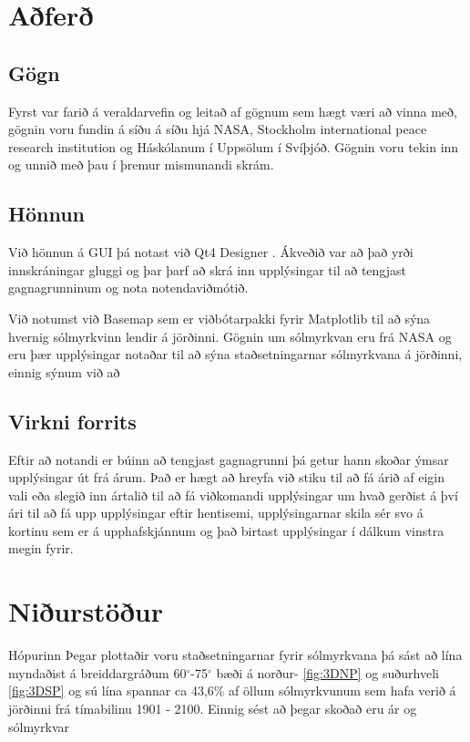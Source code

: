 \documentclass[12pt, git, final]{rureport}
\begin{document}
\section{Aðferð}
\subsection{Gögn}
Fyrst var farið á veraldarvefin og leitað af gögnum sem hægt væri að vinna með, gögnin voru fundin á síðu á síðu hjá NASA\cite{Eclipse}, Stockholm international peace research institution\cite{weapon} og Háskólanum í Uppsölum í Svíþjóð\cite{conflict}. Gögnin voru tekin inn og unnið með þau í þremur mismunandi skrám.
\subsection{Hönnun}
Við hönnun á GUI þá notast  við Qt4 Designer \cite{qt4}. Ákveðið var að það yrði innskráningar gluggi og þar þarf að skrá inn upplýsingar til að tengjast gagnagrunninum og nota notendaviðmótið.

Við notumst við Basemap\cite{basemap} sem er viðbótarpakki fyrir Matplotlib til að sýna hvernig sólmyrkvinn lendir á jörðinni. Gögnin um sólmyrkvan eru frá NASA og eru þær upplýsingar notaðar til að sýna staðsetningarnar sólmyrkvana á jörðinni, einnig sýnum við að 

\subsection{Virkni forrits}
Eftir að notandi er búinn að tengjast gagnagrunni þá getur hann skoðar ýmsar upplýsingar út frá árum. Það er hægt að hreyfa við stiku til að fá árið af eigin vali eða slegið inn ártalið til að fá viðkomandi upplýsingar um hvað gerðist á því ári til að fá upp upplýsingar eftir hentisemi, upplýsingarnar skila sér svo á kortinu sem er á upphafskjánnum og það birtast upplýsingar í dálkum vinstra megin fyrir. 


\section{Niðurstöður}\label{nidurstodur}
Hópurinn
Þegar plottaðir voru staðsetningarnar fyrir sólmyrkvana þá sást að lína myndaðist á breiddargráðum 60$^{\circ}$-75$^{\circ}$ bæði á norður- \ref{fig:3DNP} og suðurhveli \ref{fig:3DSP} og sú lína spannar ca 43,6\% af öllum sólmyrkvunum sem hafa verið á jörðinni frá tímabilinu 1901 - 2100. 
Einnig sést að þegar skoðað eru ár og sólmyrkvar
\pagebreak
\end{document}
